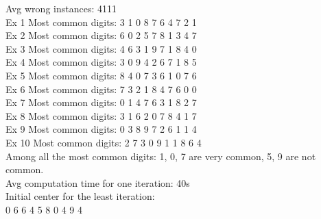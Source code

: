 \documentclass[paper=a4, fontsize=11pt]{scrartcl} %
\numberwithin{equation}{section} %
\numberwithin{figure}{section} %
\numberwithin{table}{section} %
\begin{document}
Avg wrong instances: 4111 \\
Ex 1 Most common digits: 3 1 0 8 7 6 4 7 2 1 \\
Ex 2 Most common digits: 6 0 2 5 7 8 1 3 4 7\\
Ex 3 Most common digits: 4 6 3 1 9 7 1 8 4 0\\
Ex 4 Most common digits: 3 0 9 4 2 6 7 1 8 5\\
Ex 5 Most common digits: 8 4 0 7 3 6 1 0 7 6\\
Ex 6 Most common digits: 7 3 2 1 8 4 7 6 0 0\\
Ex 7 Most common digits: 0 1 4 7 6 3 1 8 2 7\\
Ex 8 Most common digits: 3 1 6 2 0 7 8 4 1 7\\
Ex 9 Most common digits: 0 3 8 9 7 2 6 1 1 4\\
Ex 10 Most common digits: 2 7 3 0 9 1 1 8 6 4\\

Among all the most common digits: 1, 0, 7 are very common, 5, 9 are not common.\\

Avg computation time for one iteration: 40s\\

Initial center for the least iteration:\\
0 6 6 4 5 8 0 4 9 4 \\
\end{document}
